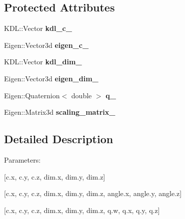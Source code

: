 \subsection*{Protected Attributes}
\begin{DoxyCompactItemize}
\item 
\hypertarget{classhiqp_1_1geometric__primitives_1_1GeometricBox_ad9b5e3a8dcc30620584bf27d6d1dda71}{K\-D\-L\-::\-Vector {\bfseries kdl\-\_\-c\-\_\-}}\label{classhiqp_1_1geometric__primitives_1_1GeometricBox_ad9b5e3a8dcc30620584bf27d6d1dda71}

\item 
\hypertarget{classhiqp_1_1geometric__primitives_1_1GeometricBox_a96ad47d72a6dbf78c4f52db15a52ed01}{Eigen\-::\-Vector3d {\bfseries eigen\-\_\-c\-\_\-}}\label{classhiqp_1_1geometric__primitives_1_1GeometricBox_a96ad47d72a6dbf78c4f52db15a52ed01}

\item 
\hypertarget{classhiqp_1_1geometric__primitives_1_1GeometricBox_aa4bd006daadaa6feed4fd24c1892629a}{K\-D\-L\-::\-Vector {\bfseries kdl\-\_\-dim\-\_\-}}\label{classhiqp_1_1geometric__primitives_1_1GeometricBox_aa4bd006daadaa6feed4fd24c1892629a}

\item 
\hypertarget{classhiqp_1_1geometric__primitives_1_1GeometricBox_a8be3b55e5793038692a7f43663b97309}{Eigen\-::\-Vector3d {\bfseries eigen\-\_\-dim\-\_\-}}\label{classhiqp_1_1geometric__primitives_1_1GeometricBox_a8be3b55e5793038692a7f43663b97309}

\item 
\hypertarget{classhiqp_1_1geometric__primitives_1_1GeometricBox_a4a57c7bef7efb4ed2f5535c796b00678}{Eigen\-::\-Quaternion$<$ double $>$ {\bfseries q\-\_\-}}\label{classhiqp_1_1geometric__primitives_1_1GeometricBox_a4a57c7bef7efb4ed2f5535c796b00678}

\item 
\hypertarget{classhiqp_1_1geometric__primitives_1_1GeometricBox_a6889ebbde5629bcd835a63948a3062b8}{Eigen\-::\-Matrix3d {\bfseries scaling\-\_\-matrix\-\_\-}}\label{classhiqp_1_1geometric__primitives_1_1GeometricBox_a6889ebbde5629bcd835a63948a3062b8}

\end{DoxyCompactItemize}


\subsection{Detailed Description}
Parameters\-:\par
 \mbox{[}c.\-x, c.\-y, c.\-z, dim.\-x, dim.\-y, dim.\-z\mbox{]} \par
 \mbox{[}c.\-x, c.\-y, c.\-z, dim.\-x, dim.\-y, dim.\-z, angle.\-x, angle.\-y, angle.\-z\mbox{]} \par
 \mbox{[}c.\-x, c.\-y, c.\-z, dim.\-x, dim.\-y, dim.\-z, q.\-w, q.\-x, q.\-y, q.\-z\mbox{]} \par
 


